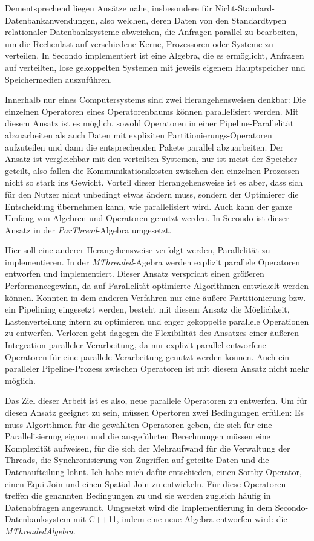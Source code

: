 \documentclass[a4paper,12pt,twoside]{article}
\newcommand{\Fb}[1]{\textit{#1}} %
\begin{document}
Dementsprechend liegen Ansätze nahe, insbesondere für Nicht-Standard-Datenbankanwendungen, also welchen, deren Daten von den Standardtypen relationaler Datenbanksysteme abweichen, die Anfragen parallel zu bearbeiten, um die Rechenlast auf verschiedene Kerne, Prozessoren oder Systeme zu verteilen. In Secondo implementiert ist eine Algebra, die es ermöglicht, Anfragen auf verteilten, lose gekoppelten Systemen mit jeweils eigenem Hauptspeicher und Speichermedien auszuführen.

Innerhalb nur eines Computersystems sind zwei Herangehensweisen denkbar: Die einzelnen Operatoren eines Operatorenbaums können parallelisiert werden. Mit diesem Ansatz ist es möglich, sowohl Operatoren in einer Pipeline-Parallelität abzuarbeiten als auch Daten mit expliziten Partitionierungs-Operatoren aufzuteilen und dann die entsprechenden Pakete parallel abzuarbeiten. Der Ansatz ist vergleichbar mit den verteilten Systemen, nur ist meist der Speicher geteilt, also fallen die Kommunikationskosten zwischen den einzelnen Prozessen nicht so stark ins Gewicht. Vorteil dieser Herangehensweise ist es aber, dass sich für den Nutzer nicht unbedingt etwas ändern muss, sondern der Optimierer die Entscheidung übernehmen kann, wie parallelisiert wird. Auch kann der ganze Umfang von Algebren und Operatoren genutzt werden. In Secondo ist dieser Ansatz in der \Fb{ParThread}-Algebra umgesetzt.

Hier soll eine anderer Herangehensweise verfolgt werden, Parallelität zu implementieren. In der \Fb{MThreaded}-Agebra werden explizit parallele Operatoren entworfen und implementiert. Dieser Ansatz verspricht einen größeren Performancegewinn, da auf Parallelität optimierte Algorithmen entwickelt werden können. Konnten in dem anderen Verfahren nur eine äußere Partitionierung bzw. ein Pipelining eingesetzt werden, besteht mit diesem Ansatz die Möglichkeit, Lastenverteilung intern zu optimieren und enger gekoppelte parallele Operationen zu entwerfen. Verloren geht dagegen die Flexibilität des Ansatzes einer äußeren Integration paralleler Verarbeitung, da nur explizit parallel entworfene Operatoren für eine parallele Verarbeitung genutzt werden können. Auch ein paralleler Pipeline-Prozess zwischen Operatoren ist mit diesem Ansatz nicht mehr möglich.

Das Ziel dieser Arbeit ist es also, neue parallele Operatoren zu entwerfen. Um für diesen Ansatz geeignet zu sein, müssen Opertoren zwei Bedingungen erfüllen: Es muss Algorithmen für die gewählten Operatoren geben, die sich für eine Parallelisierung eignen und die ausgeführten Berechnungen müssen eine Komplexität aufweisen, für die sich der Mehraufwand für die Verwaltung der Threads, die Synchronisierung von Zugriffen auf geteilte Daten und die Datenaufteilung lohnt. Ich habe mich dafür entschieden, einen Sortby-Operator, einen Equi-Join und einen Spatial-Join zu entwickeln. Für diese Operatoren treffen die genannten Bedingungen zu und sie werden zugleich häufig in Datenabfragen angewandt. Umgesetzt wird die Implementierung in dem Secondo-Datenbanksystem mit C++11, indem eine neue Algebra entworfen wird: die \Fb{MThreadedAlgebra}. 
\end{document}
